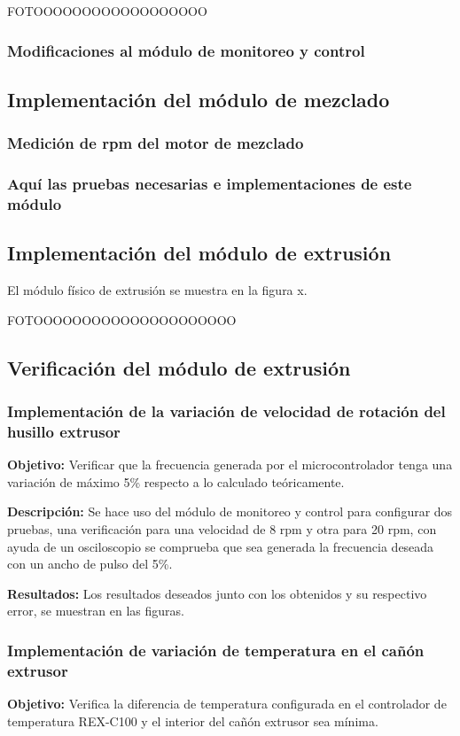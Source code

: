 \documentclass[14pt,oneside]{extarticle} %
\begin{document}
FOTOOOOOOOOOOOOOOOOOO

\subsubsection{Modificaciones al módulo de monitoreo y control}


\subsection{Implementación del módulo de mezclado}

\subsubsection{Medición de rpm del motor de mezclado}
\subsubsection{Aquí las pruebas necesarias e implementaciones de este módulo}

\subsection{Implementación del módulo de extrusión}
El módulo físico de extrusión se muestra en la figura x.

FOTOOOOOOOOOOOOOOOOOOOOO

\subsection{Verificación del módulo de extrusión}
\subsubsection{Implementación de la variación de velocidad de rotación del husillo extrusor}
\textbf{Objetivo:} Verificar que la frecuencia generada por el microcontrolador tenga una variación de máximo 5\% respecto a lo calculado teóricamente.

\textbf{Descripción:} Se hace uso del módulo de monitoreo y control para configurar dos pruebas, una verificación para una velocidad de 8 rpm y otra para 20 rpm, con ayuda de un osciloscopio se comprueba que sea generada la frecuencia deseada con un ancho de pulso del 5\%.

\textbf{Resultados:} Los resultados deseados junto con los obtenidos y su respectivo error, se muestran en las figuras.

\subsubsection{Implementación de variación de temperatura en el cañón extrusor}
\textbf{Objetivo:} Verifica la diferencia de temperatura configurada en el controlador de temperatura REX-C100 y el interior del cañón extrusor sea mínima.
\end{document}
